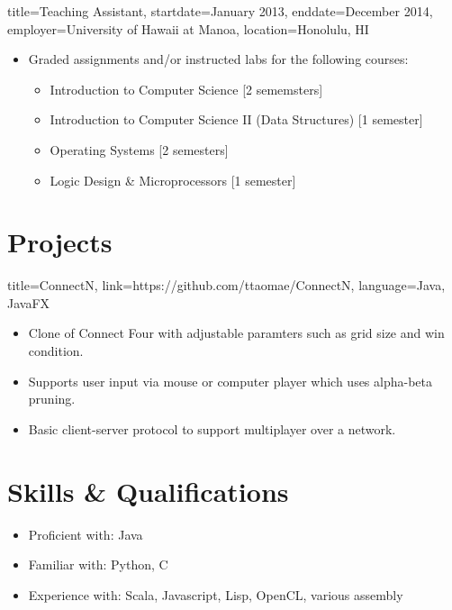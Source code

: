 \documentclass{resume}
\begin{document}
\begin{job}{title=Teaching Assistant,
            startdate=January 2013,
            enddate=December 2014,
            employer=University of Hawaii at Manoa,
            location={Honolulu, HI}}
    \begin{itemize}
        \item{Graded assignments and/or instructed labs for the following courses:}
        \begin{itemize}
            \item{Introduction to Computer Science [2 sememsters]}
            \item{Introduction to Computer Science II (Data Structures) [1 semester]}
            \item{Operating Systems [2 semesters]}
            \item{Logic Design \& Microprocessors [1 semester]}
        \end{itemize}
    \end{itemize}
\end{job}

\section*{Projects}
\begin{project}{title=ConnectN,
            link=https://github.com/ttaomae/ConnectN,
            language={Java, JavaFX}}
    \begin{itemize}
        \item{Clone of Connect Four with adjustable paramters such as grid size and win condition.}
        \item{Supports user input via mouse or computer player which uses alpha-beta pruning.}
        \item{Basic client-server protocol to support multiplayer over a network.}
    \end{itemize}
\end{project}

\section*{Skills \& Qualifications}
\begin{itemize}
    \item{Proficient with: Java}
    \item{Familiar with: Python, C}
    \item{Experience with: Scala, Javascript, Lisp, OpenCL, various assembly}
\end{itemize}
\end{document}
